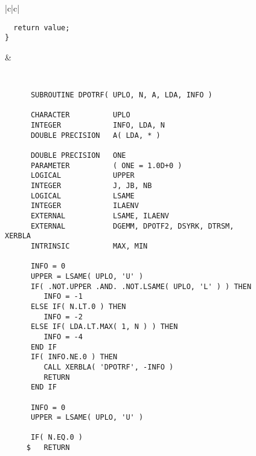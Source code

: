 \begin{figure}[tbp]
\begin{center}
\begin{tabular}{|c|c|}
\begin{minipage}[t]{3in}
{\begin{verbatim}
  return value;
}
\end{verbatim}
}
\end{minipage}
&
\begin{minipage}[t]{3in}
{\tt \tiny
\begin{verbatim}
      SUBROUTINE DPOTRF( UPLO, N, A, LDA, INFO )

      CHARACTER          UPLO
      INTEGER            INFO, LDA, N
      DOUBLE PRECISION   A( LDA, * )

      DOUBLE PRECISION   ONE
      PARAMETER          ( ONE = 1.0D+0 )
      LOGICAL            UPPER
      INTEGER            J, JB, NB
      LOGICAL            LSAME
      INTEGER            ILAENV
      EXTERNAL           LSAME, ILAENV
      EXTERNAL           DGEMM, DPOTF2, DSYRK, DTRSM, XERBLA
      INTRINSIC          MAX, MIN

      INFO = 0
      UPPER = LSAME( UPLO, 'U' )
      IF( .NOT.UPPER .AND. .NOT.LSAME( UPLO, 'L' ) ) THEN
         INFO = -1
      ELSE IF( N.LT.0 ) THEN
         INFO = -2
      ELSE IF( LDA.LT.MAX( 1, N ) ) THEN
         INFO = -4
      END IF
      IF( INFO.NE.0 ) THEN
         CALL XERBLA( 'DPOTRF', -INFO )
         RETURN
      END IF

      INFO = 0
      UPPER = LSAME( UPLO, 'U' )

      IF( N.EQ.0 )
     $   RETURN


\end{verbatim}}
\end{minipage}
\end{tabular}
\end{center}
\end{figure}
